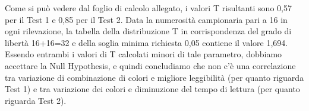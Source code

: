 \documentclass[a4paper]{article}
\begin{document}
Come si può vedere dal foglio di calcolo allegato, i valori T risultanti sono 0,57 per il Test 1 e 0,85 per il Test 2.
Data la numerosità campionaria pari a 16 in ogni rilevazione, la tabella della distribuzione T in corrispondenza del grado di libertà 16+16=32 e della soglia minima richiesta 0,05 contiene il valore 1,694. Essendo entrambi i valori di T calcolati minori di tale parametro, dobbiamo accettare la Null Hypothesis, e quindi concludiamo che non c'è una correlazione tra variazione di combinazione di colori e migliore leggibilità (per quanto riguarda Test 1) e tra variazione dei colori e diminuzione del tempo di lettura (per quanto riguarda Test 2).
\end{document}
